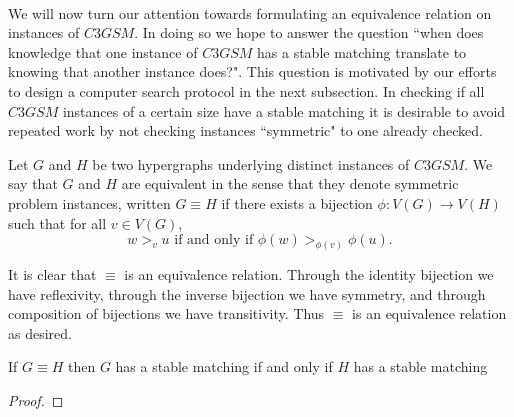 \begin{definition}
\paragraph{}
We will now turn our attention towards formulating an equivalence relation on instances of $C3GSM$. In doing so we hope to answer the question ``when does knowledge that one instance of $C3GSM$ has a stable matching translate to knowing that another instance does?". This question is motivated by our efforts to design a computer search protocol in the next subsection. In checking if all $C3GSM$ instances of a certain size have a stable matching it is desirable to avoid repeated work by not checking instances ``symmetric" to one already checked.
\begin{definition}
Let $G$ and $H$ be two hypergraphs underlying distinct instances of $C3GSM$. We say that $G$ and $H$ are equivalent in the sense that they denote symmetric problem instances, written $G \equiv H$ if there exists a bijection $\phi: V(G) \rightarrow V(H)$ such that for all $v \in V(G)$,
 \begin{equation}\label{cond:order}
 w >_v u \text{ if and only if } \phi(w) >_{\phi(v)} \phi(u).
 \end{equation}
 \end{definition}
\begin{note}
It is clear that $\equiv$ is an equivalence relation. Through the identity bijection we have reflexivity, through the inverse bijection we have symmetry, and through composition of bijections we have transitivity. Thus $\equiv$ is an equivalence relation as desired.
\end{note}
 \begin{lemma}
 If $G \equiv H$ then $G$ has a stable matching if and only if $H$ has a stable matching
 \end{lemma}
 \begin{proof}

\end{proof}
\end{definition}
